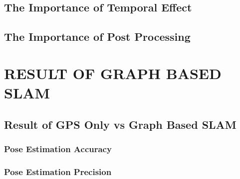 \section{The Importance of Temporal Effect}
\TheImportantofTemporalEffect
\section{The Importance of Post Processing}
\TheImportantofPostProcessing

\chapter{RESULT OF GRAPH BASED SLAM}
\label{sec:chap4_result3}
\section*{ }

\section{Result of GPS Only vs Graph Based SLAM}
\ResultofGPSOnlyvsGraphBasedSLAM
\subsection{Pose Estimation Accuracy}
\PoseEstimationAccuracy
\subsection{Pose Estimation Precision}
\PoseEstimationPrecision




